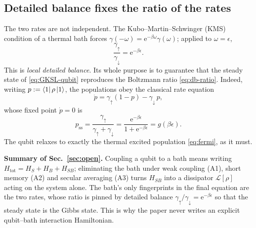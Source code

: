 \documentclass[11pt,a4paper]{article}
\newcommand{\ee}{\mathrm{e}}
\newcommand{\calL}{\mathcal{L}}
\theoremstyle{definition}
\theoremstyle{remark}
\begin{document}
\subsection{Detailed balance fixes the ratio of the rates}
The two rates are not independent. The Kubo--Martin--Schwinger (KMS)
condition of a thermal bath forces
$\gamma(-\omega)=\ee^{-\beta\omega}\gamma(\omega)$; applied to
$\omega=\epsilon$,
\begin{equation}
\frac{\gamma_\uparrow}{\gamma_\downarrow} = \ee^{-\beta\epsilon}.
\label{eq:db-rates}
\end{equation}
This is \emph{local detailed balance}. Its whole purpose is to guarantee
that the steady state of \eqref{eq:GKSL-qubit} reproduces the Boltzmann
ratio \eqref{eq:db-ratio}. Indeed, writing $p:=\bra{1}\rho\ket{1}$, the
populations obey the classical rate equation
\begin{equation}
\dot p = \gamma_\uparrow(1-p) - \gamma_\downarrow\, p ,
\label{eq:pop-rate}
\end{equation}
whose fixed point $\dot p=0$ is
\begin{equation}
p_{\mathrm{ss}}
= \frac{\gamma_\uparrow}{\gamma_\uparrow+\gamma_\downarrow}
= \frac{\ee^{-\beta\epsilon}}{1+\ee^{-\beta\epsilon}}
= g(\beta\epsilon).
\end{equation}
The qubit relaxes to exactly the thermal excited population
\eqref{eq:fermi}, as it must.

\begin{keybox}
\textbf{Summary of Sec.~\ref{sec:open}.} Coupling a qubit to a bath
means writing $H_{\mathrm{tot}}=H_S+H_B+H_{SB}$; eliminating the bath
under weak coupling (A1), short memory (A2) and secular averaging (A3)
turns $H_{SB}$ into a dissipator $\calL[\rho]$ acting on the system
alone. The bath's only fingerprints in the final equation are the two
rates, whose ratio is pinned by detailed balance
$\gamma_\uparrow/\gamma_\downarrow=\ee^{-\beta\epsilon}$ so that the
steady state is the Gibbs state. This is why the paper never writes an
explicit qubit--bath interaction Hamiltonian.
\end{keybox}
\end{document}
